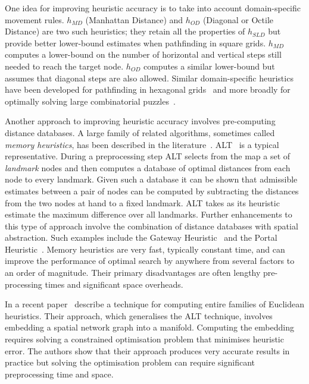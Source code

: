 One idea for improving heuristic accuracy is to take into account 
domain-specific movement rules.  $h_{MD}$ (Manhattan Distance) and $h_{OD}$ (Diagonal
or Octile Distance) are two such heuristics; they retain all the properties of
$h_{SLD}$ but provide better lower-bound estimates when pathfinding in square
grids. $h_{MD}$ computes a lower-bound on the number of horizontal and vertical
steps still needed to reach the target node. $h_{OD}$ computes a similar
lower-bound but assumes that diagonal steps are also allowed.  Similar
domain-specific heuristics have been developed for pathfinding in hexagonal
grids~\citep{yap02} and more broadly for optimally solving large combinatorial
puzzles~\citep{korf96}.

Another approach to improving heuristic accuracy involves pre-computing
distance databases.  A large family of related algorithms, sometimes called
\emph{memory heuristics}, has been described in the
literature~\citep{goldberg05,bjornsson06,sturtevant07,felner09,goldenberg10,
anderson10,yap11}.
ALT~\citep{goldberg05} is a typical representative. During a preprocessing
step ALT selects from the map a set of \emph{landmark} nodes and then computes
a database of optimal distances from each node to every landmark. Given such a
database it can be shown that admissible estimates between a pair of nodes can
be computed by subtracting the distances from the two nodes at hand to a fixed
landmark.  ALT takes as its heuristic estimate the maximum difference over all
landmarks.  Further enhancements to this type of approach involve the
combination of distance databases with spatial abstraction. Such examples
include the Gateway Heuristic~\citep{bjornsson06} and the Portal
Heuristic~\citep{goldenberg10}. Memory heuristics are very fast, typically
constant time, and can improve the performance of optimal search by anywhere
from several factors to an order of magnitude. Their primary disadvantages are
often lengthy pre-processing times and significant space overheads. 

In a recent paper~\cite{rayner11} describe a technique for computing entire
families of Euclidean heuristics. Their approach, which generalises the 
ALT technique, involves
embedding a spatial network graph into a manifold. Computing the embedding
requires solving a constrained optimisation problem that minimises heuristic
error. The authors show that their approach produces very accurate results in
practice but solving the optimisation problem can require significant
preprocessing time and space.  

